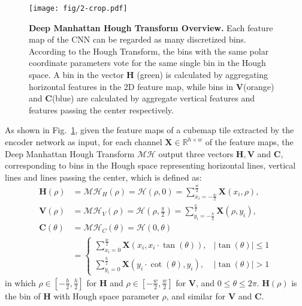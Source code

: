 \documentclass[runningheads]{llncs}
\begin{document}
\begin{figure}[!h]
	\centering
	\texttt{[image: fig/2-crop.pdf]}
	\caption{\textbf{Deep Manhattan Hough Transform Overview. } Each feature map of the CNN can be regarded as many discretized bins. According to the Hough Transform, the bins with the same polar coordinate parameters vote for the same single bin in the Hough space. A bin in the vector $\mathbf{H}$ (green) is calculated by aggregating horizontal features in the 2D feature map, while bins in $\mathbf{V}$(orange) and $\mathbf{C}$(blue) are calculated by aggregate vertical features and features passing the center respectively.}
	\label{fig:hough} 
\end{figure}

As shown in Fig.~\ref{fig:hough}, given the feature maps of a cubemap tile extracted by the encoder network as input, for each channel $\mathbf{X} \in \mathbb{R}^{h\times w}$ of the feature maps, the Deep Manhattan Hough Transform $\mathcal{MH}$ output three vectors $\mathbf{H}, \mathbf{V}$ and $\mathbf{C}$, corresponding to bins in the Hough space representing horizontal lines, vertical lines and lines passing the center, which is defined as:
\begin{equation}\label{formula:DMHT}\begin{aligned}
    \mathbf{H}(\rho)&=\mathcal{MH}_{H}(\rho) = \mathcal{H}(\rho, 0) = \sum_{x_i=-\frac{w}{2}}^{\frac{w}{2}} \mathbf{X}(x_i, \rho),\\
    \mathbf{V}(\rho)&=\mathcal{MH}_{V}(\rho) = \mathcal{H}(\rho, \frac{\pi}{2}) = \sum_{y_i=-\frac{h}{2}}^{\frac{h}{2}} \mathbf{X}(\rho, y_i),\\
    \mathbf{C}(\theta)&=\mathcal{MH}_{C}(\theta) = \mathcal{H}(0, \theta)\\
    &=\left\{ \begin{array}{lr}
        \sum_{x_i=0}^{\frac{w}{2}} \mathbf{X}(x_i, x_i\cdot \tan(\theta)), &|\tan(\theta)| \leq 1 \\
        \sum_{y_i=0}^{\frac{h}{2}} \mathbf{X}(y_i \cdot \cot(\theta), y_i), &|\tan(\theta)| > 1
    \end{array}\right.
\end{aligned}\end{equation}
in which $\rho \in [-\frac{h}{2},\frac{h}{2}]$ for $\mathbf{H}$ and $\rho \in [-\frac{w}{2},\frac{w}{2}]$ for $\mathbf{V}$, and $0\leq\theta\leq 2\pi$. $\mathbf{H}(\rho)$ is the bin of $\mathbf{H}$ with Hough space parameter $\rho$, and similar for $\mathbf{V}$ and $\mathbf{C}$. 
\end{document}
